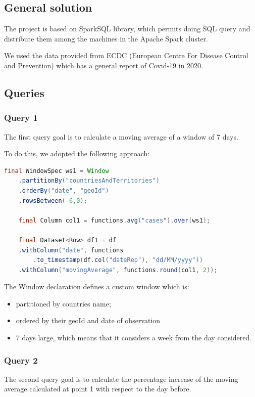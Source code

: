\documentclass[table, 12pt]{article}
\begin{document}
\subsection{General solution}

The project is based on SparkSQL library, which permits doing SQL query and distribute them among the machines in the Apache Spark cluster.

We used the data provided from ECDC (European Centre For Disease Control and Prevention) which has a general report of Covid-19 in 2020.

\subsection{Queries}
\subsubsection{Query 1}


The first query goal is to calculate a moving average of a window of 7 days.

To do this, we adopted the following approach:
\lstset{%
caption=,
basicstyle=\ttfamily\footnotesize\bfseries,
frame=tb
}
\begin{lstlisting}[language=Java, caption=Query 1]
	final WindowSpec ws1 = Window
	.partitionBy("countriesAndTerritories")
	.orderBy("date", "geoId")
	.rowsBetween(-6,0);

	final Column col1 = functions.avg("cases").over(ws1);

	final Dataset<Row> df1 = df
	.withColumn("date", functions
		.to_timestamp(df.col("dateRep"), "dd/MM/yyyy"))
	.withColumn("movingAverage", functions.round(col1, 2));
\end{lstlisting}

The Window declaration defines a custom window which is:
\begin{itemize}
	\item partitioned by countries name;
	\item ordered by their geoId and date of observation
	\item 7 days large, which means that it considers a week from the day considered.
\end{itemize}

\subsubsection{Query 2}
The second query goal is to calculate the percentage increase of the moving average calculated at point 1 with respect to the day before.
\end{document}
